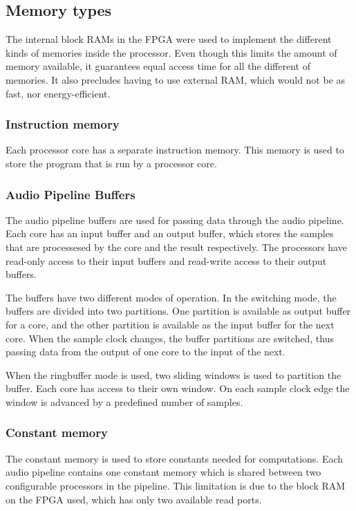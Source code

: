 
\subsection{Memory types}\label{subsec:fpga-memory}

The internal block RAMs in the FPGA were used to implement the different kinds
of memories inside the processor. Even though this limits the amount of
memory available, it guarantees equal access time for all the different
of memories. It also precludes having to use external RAM, which would not be as
fast, nor energy-efficient.

\subsubsection{Instruction memory}
Each processor core has a separate instruction memory. This memory is used to
store the program that is run by a processor core.

\subsubsection{Audio Pipeline Buffers}
The audio pipeline buffers are used for passing data through the audio pipeline.
Each core has an input buffer and an output buffer, which stores the samples
that are processesed by the core and the result respectively. The processors
have read-only access to their input buffers and read-write access to their
output buffers.

The buffers have two different modes of operation. In the switching mode,
the buffers are divided into two partitions. One partition is available
as output buffer for a core, and the other partition is available as the
input buffer for the next core. When the sample clock
changes, the buffer partitions are switched, thus passing data from the
output of one core to the input of the next.

When the ringbuffer mode is used, two sliding windows is used to partition
the buffer. Each core has access to their own window. On each sample clock
edge the window is advanced by a predefined number
of samples.

\subsubsection{Constant memory}
The constant memory is used to store constants needed for computations. Each
audio pipeline contains one constant memory which is shared between two
configurable processors in the pipeline. This limitation is due to the block
RAM on the FPGA used, which has only two available read ports.


